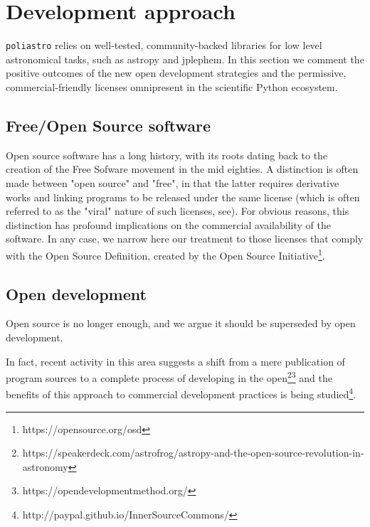 \section{Development approach}
\label{sec:development}

\verb|poliastro| relies on well-tested, community-backed libraries for low level astronomical tasks, such as astropy\cite{Robitaille2013} and jplephem. In this section we comment the positive outcomes of the new open development strategies and the permissive, commercial-friendly licenses omnipresent in the scientific Python ecosystem.

\subsection{Free/Open Source software}

Open source software has a long history, with its roots dating back to the creation of the Free Sofware movement in the mid eighties\cite{Stallman:1985:GM}. A distinction is often made between "open source" and "free", in that the latter requires derivative works and linking programs to be released under the same license (which is often referred to as the "viral" nature of such licenses, see\cite{stallman2009viewpoint}). For obvious reasons, this distinction has profound implications on the commercial availability of the software. In any case, we narrow here our treatment to those licenses that comply with the Open Source Definition, created by the Open Source Initiative\footnote{https://opensource.org/osd}.



\subsection{Open development}

Open source is no longer enough, and we argue it should be superseded by open development.

In fact, recent activity in this area suggests a shift from a mere publication of program sources to a complete process of developing in the open\footnote{https://speakerdeck.com/astrofrog/astropy-and-the-open-source-revolution-in-astronomy}\footnote{https://opendevelopmentmethod.org/} and the benefits of this approach to commercial development practices is being studied\footnote{http://paypal.github.io/InnerSourceCommons/}.
